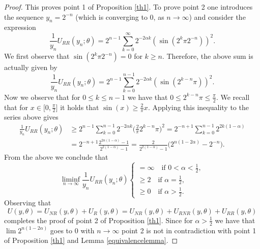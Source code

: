 \documentclass[10pt,a4paper]{amsart}
\begin{document}
\begin{proof}
This proves point 1 of Proposition \ref{th1}. To prove point 2 one introduces the sequence $y_n=2^{-n}$ (which is converging to 0, as $n \rightarrow \infty$)  and consider the expression
\begin{equation}
\frac{1}{ y_n } U_{RR} (y_n;\theta)=2^{n-1}   \sum_{k =0}^{\infty} 2^{-2\alpha k} (\sin(2^{k } \pi 2^{-n}))^2.
\end{equation}
We first observe that $\sin(2^{k } \pi 2^{-n}) = 0$ for $k \geq n$. Therefore, the above sum is actually given by
\begin{equation}
\frac{1}{ y_n } U_{RR} (y_n;\theta)=2^{n-1}   \sum_{k =0}^{n-1} 2^{-2\alpha k} (\sin(2^{k -n} \pi ))^2.
\end{equation}
Now we observe that for $0 \leq k \leq n-1$ we have that $0 \leq 2^{k -n} \pi \leq \frac{\pi}{2}$. We recall that for $x \in \big[ 0, \frac{\pi}{2} \big]$ it holds that $\sin (x) \geq \frac{2}{\pi } x$. Applying this inequality to the series above gives
\begin{align*}
\frac{1}{ y_n } U_{RR} (y_n;\theta) &\geq 2^{n-1} \sum_{k =0}^{n-1} 2^{-2\alpha k} \bigg( \frac{2}{\pi} 2^{k -n} \pi \bigg)^2 = 2^{-n+1} \sum_{k =0}^{n-1} 2^{2k (1 - \alpha)} \\
&= 2^{-n+1} \frac{2^{2n(1-\alpha)} - 1}{2^{2(1-\alpha)} -1} = \frac{2}{2^{2(1-\alpha)} -1} \big( 2^{n(1-2\alpha)} - 2^{-n} \big).
\end{align*}
From the above we conclude that
\begin{equation}
\liminf_{n \rightarrow \infty} \frac{1}{ y_n } U_{RR} (y_n;\theta) \begin{cases}
= \infty \quad \text{if } 0 < \alpha < \frac{1}{2}, \\
\geq 2 \quad \text{if } \alpha = \frac{1}{2}, \\
\geq 0 \quad \text{if } \alpha > \frac{1}{2}.
\end{cases}
\end{equation}
Observing that 
\begin{equation*}
U(y,\theta) = U_{NR}(y,\theta) +  U_{R}(y,\theta) =  U_{NR}(y,\theta) + U_{RNR}(y,\theta) + U_{RR}(y,\theta)
\end{equation*}
completes the proof of point 2 of Proposition \ref{th1}. Since for $\alpha >\frac 12$ we have that $\lim 2^{n(1-2\alpha)}$ goes to $0$ with $n\rightarrow \infty$ point 2 is not in contradiction with point 1 of Proposition \ref{th1} and Lemma \ref{equivalencelemma}.
\end{proof}
\end{document}
